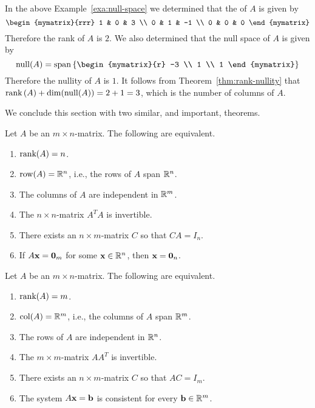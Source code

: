 \begin{solution}
  In the above Example~\ref{exa:null-space} we determined that the
  {\rref} of $A$ is given by
  \begin{equation*}
    \begin{mymatrix}{rrr}
      1 & 0 & 3 \\
      0 & 1 & -1  \\
      0 & 0 & 0
    \end{mymatrix}
  \end{equation*}
  Therefore the rank of $A$ is $2$. We also determined that the null
  space of $A$ is given by
  \begin{equation*}
    \nullspace(A) = \sspan \set{\begin{mymatrix}{r}
        -3 \\
        1 \\
        1
      \end{mymatrix}
    }
  \end{equation*}
  Therefore the nullity of $A$ is $1$. It follows from
  Theorem~\ref{thm:rank-nullity} that
  $\func{rank}\tup{A} + \dim( \nullspace(A)) = 2 + 1 = 3$, which
  is the number of columns of $A$.
\end{solution}

We conclude this section with two similar, and important, theorems.

\begin{theorem}{}{}
  Let $A$ be an $m\times n$-matrix.
  The following are equivalent.
  \begin{enumerate}
  \item $\mbox{\rm rank}(A)=n$.
  \item $\row(A)=\R^n$, i.e., the rows of $A$ span $\mathbb{R}^n$.
  \item The columns of $A$ are independent in $\mathbb{R}^m$.
  \item The $n\times n$-matrix $A^TA$ is invertible.
  \item There exists an $n\times m$-matrix $C$ so that $CA=I_n$.
  \item If $A\mbox{\bf x}=\mbox{\bf 0}_m$ for some $\mbox{\bf x}\in\mathbb{R}^n$,
    then $\mbox{\bf x}=\mbox{\bf 0}_n$.
  \end{enumerate}
\end{theorem}

\begin{theorem}{}{}
  Let $A$ be an $m\times n$-matrix.
  The following are equivalent.
  \begin{enumerate}
  \item $\mbox{\rm rank}(A)=m$.
  \item $\col(A)=\R^m$, i.e., the columns of $A$ span $\mathbb{R}^m$.
  \item The rows of $A$ are independent in $\mathbb{R}^n$.
  \item The $m\times m$-matrix $AA^T$ is invertible.
  \item There exists an $n\times m$-matrix $C$ so that $AC=I_m$.
  \item The system $A\mbox{\bf x}=\mbox{\bf b}$ is consistent for
    every $\mbox{\bf b}\in\mathbb{R}^m$.
  \end{enumerate}
\end{theorem}
